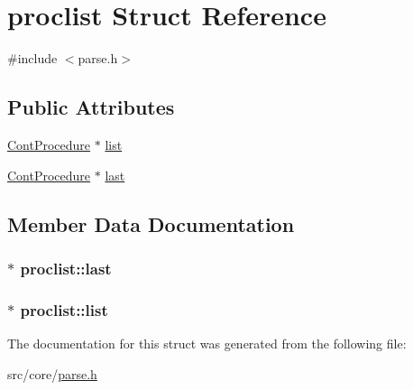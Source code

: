 \hypertarget{a00119}{\section{proclist Struct Reference}
\label{a00119}
}


{\ttfamily \#include $<$parse.\-h$>$}

\subsection*{Public Attributes}
\begin{DoxyCompactItemize}
\item 
\hyperlink{a00067}{Cont\-Procedure} $\ast$ \hyperlink{a00119_a1a73729fb42b8f77a6ebc2002be47d99}{list}
\item 
\hyperlink{a00067}{Cont\-Procedure} $\ast$ \hyperlink{a00119_ab33a6c25546cb62d334dc7c17d4def14}{last}
\end{DoxyCompactItemize}


\subsection{Member Data Documentation}
\hypertarget{a00119_ab33a6c25546cb62d334dc7c17d4def14}{
\subsubsection[{last}]{$\ast$ proclist\-::last}}\label{a00119_ab33a6c25546cb62d334dc7c17d4def14}
\hypertarget{a00119_a1a73729fb42b8f77a6ebc2002be47d99}{
\subsubsection[{list}]{$\ast$ proclist\-::list}}\label{a00119_a1a73729fb42b8f77a6ebc2002be47d99}


The documentation for this struct was generated from the following file\-:\begin{DoxyCompactItemize}
\item 
src/core/\hyperlink{a00221}{parse.\-h}\end{DoxyCompactItemize}
